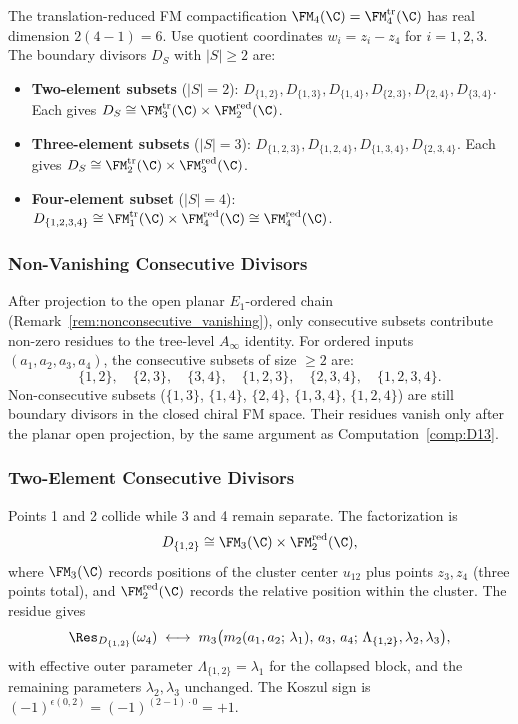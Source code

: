 The translation-reduced FM compactification
\(\FM_4(\C)=\FM_4^{\mathrm{tr}}(\C)\) has real dimension \(2(4-1)=6\).
Use quotient coordinates \(w_i=z_i-z_4\) for \(i=1,2,3\). The boundary
divisors \(D_S\) with \(|S|\ge2\) are:
\begin{itemize}
\item \textbf{Two-element subsets} (\(|S|=2\)):
\(D_{\{1,2\}}, D_{\{1,3\}}, D_{\{1,4\}}, D_{\{2,3\}},
D_{\{2,4\}}, D_{\{3,4\}}\). Each gives
\(D_S\cong\FM_3^{\mathrm{tr}}(\C)\times
\FM_2^{\mathrm{red}}(\C)\).
\item \textbf{Three-element subsets} (\(|S|=3\)):
\(D_{\{1,2,3\}}, D_{\{1,2,4\}}, D_{\{1,3,4\}},
D_{\{2,3,4\}}\). Each gives
\(D_S\cong\FM_2^{\mathrm{tr}}(\C)\times
\FM_3^{\mathrm{red}}(\C)\).
\item \textbf{Four-element subset} (\(|S|=4\)):
\(D_{\{1,2,3,4\}}\cong
\FM_1^{\mathrm{tr}}(\C)\times\FM_4^{\mathrm{red}}(\C)
\cong\FM_4^{\mathrm{red}}(\C)\).
\end{itemize}

\subsubsection{Non-Vanishing Consecutive Divisors}

After projection to the open planar \(E_1\)-ordered chain
(Remark~\ref{rem:nonconsecutive_vanishing}), only consecutive subsets
contribute non-zero residues to the tree-level \(A_\infty\) identity.
For ordered inputs \((a_1,a_2,a_3,a_4)\), the consecutive subsets of
size \(\geq2\) are:
\[
\{1,2\},\quad \{2,3\},\quad \{3,4\},\quad \{1,2,3\},\quad \{2,3,4\},\quad \{1,2,3,4\}.
\]
Non-consecutive subsets
(\(\{1,3\}\), \(\{1,4\}\), \(\{2,4\}\),
\(\{1,3,4\}\), \(\{1,2,4\}\)) are still boundary divisors in the
closed chiral FM space.  Their residues vanish only after the planar
open projection, by the same argument as Computation~\ref{comp:D13}.

\subsubsection{Two-Element Consecutive Divisors}

\begin{computation}[$D_{\{1,2\}}$ in $\FM_4(\C)$]
Points 1 and 2 collide while 3 and 4 remain separate. The factorization is
\[
D_{\{1,2\}} \cong \FM_3(\C) \times \FM_2^{\mathrm{red}}(\C),
\]
where $\FM_3(\C)$ records positions of the cluster center $u_{12}$ plus points $z_3, z_4$ (three points total), and $\FM_2^{\mathrm{red}}(\C)$ records the relative position within the cluster. The residue gives
\[
\Res_{D_{\{1,2\}}}(\omega_4) \;\longleftrightarrow\; m_3\bigl(m_2(a_1, a_2;\, \lambda_1),\, a_3,\, a_4;\, \Lambda_{\{1,2\}}, \lambda_2, \lambda_3\bigr),
\]
with effective outer parameter $\Lambda_{\{1,2\}} = \lambda_1$ for the collapsed block, and the remaining parameters $\lambda_2, \lambda_3$ unchanged. The Koszul sign is $(-1)^{\epsilon(0,2)} = (-1)^{(2-1)\cdot 0} = +1$.
\end{computation}

